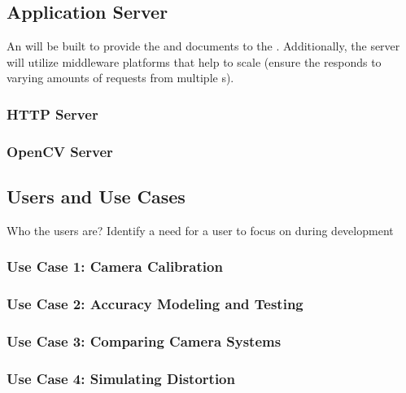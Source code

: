 \documentclass[11pt]{report}
\begin{document}
\subsection{Application Server}


An  will be built to provide the  and  documents to the . Additionally, the server will utilize middleware platforms that help to scale (ensure the  responds to varying amounts of requests from multiple s).

\subsubsection{HTTP Server}

\subsubsection{OpenCV Server}



\subsection{Users and Use Cases} 

Who the users are? Identify a need for a user to focus on during development 


\subsubsection{Use Case 1: Camera Calibration}

\subsubsection{Use Case 2: Accuracy Modeling and Testing} 

\subsubsection{Use Case 3: Comparing Camera Systems} 

\subsubsection{Use Case 4: Simulating Distortion } 
\end{document}
